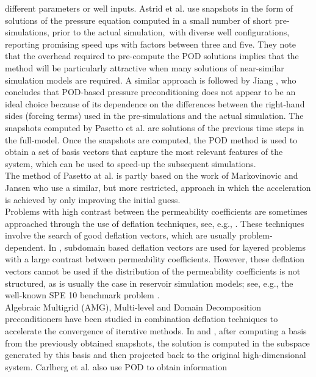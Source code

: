 \documentclass[review]{elsarticle}
\begin{document}
different parameters or well inputs. Astrid et al. \cite{Astrid11} use snapshots in the form of solutions of the pressure equation computed in a small number of short pre-simulations, prior to the actual simulation,\ with diverse well configurations, reporting promising speed ups with factors between three and five. They note that the overhead required to pre-compute the POD solutions implies that the method will be particularly attractive when many solutions of near-similar simulation models are required. A similar approach is followed by Jiang \cite{Jiang13}, who concludes that POD-based pressure preconditioning does not appear to be an ideal choice because of its dependence on the differences between the right-hand sides (forcing terms) used in the pre-simulations and the actual simulation. The snapshots computed by Pasetto et al. \cite{Pasetto16} are solutions of the previous time steps in the full-model.
Once the snapshots are computed, the POD method is used to obtain a set of basis 
vectors that capture the most relevant features of the system, which can be used to speed-up the subsequent simulations.\\
The method of Pasetto at al. \cite{Pasetto16} is partly based on the work of Markovinovic and Jansen \cite{Mark06} who use a similar, but more restricted, approach in which the acceleration is 
achieved by only improving the initial guess.\\
Problems with high contrast between the permeability coefficients are sometimes approached through the 
use of deflation techniques, see, e.g., \cite{Vuik99}. These techniques involve the search 
of good deflation vectors, which are usually problem-dependent. In \cite{Vuik99}, subdomain based deflation 
vectors are used for layered problems with a large contrast between permeability coefficients. However, 
these deflation vectors cannot be used if the distribution of the permeability coefficients  is not 
structured, as is usually the case in reservoir simulation models; see, e.g., the well-known SPE 10 benchmark problem \cite{Christie01}.\\
Algebraic Multigrid (AMG)\cite{Klie07}, Multi-level and Domain Decomposition \cite{Tang09} preconditioners have been studied in combination deflation techniques to accelerate the convergence of iterative methods.
In \cite{Mark06,Astrid11} and \cite{Pasetto16}, after computing a basis from the 
previously obtained snapshots, the solution is computed in the subspace generated by this basis and then projected 
back to the original high-dimensional system. Carlberg et al. \cite{Carlberg15} also use POD to obtain information 
\end{document}

